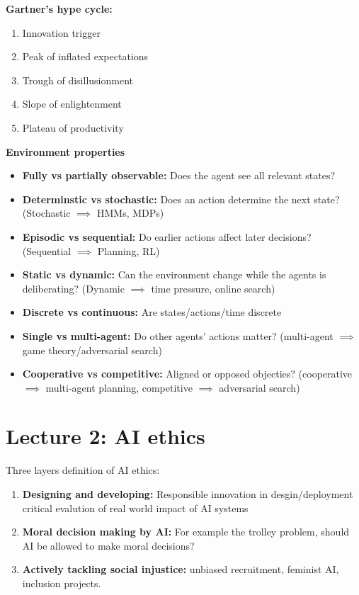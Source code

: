 \documentclass[12pt,a4paper]{article}
\begin{document}
\vspace{10pt}
\textbf{Gartner's hype cycle:}
\begin{enumerate}
    \item Innovation trigger
    \item Peak of inflated expectations
    \item Trough of disillusionment
    \item Slope of enlightenment
    \item Plateau of productivity
\end{enumerate}

\textbf{Environment properties}
\begin{itemize}
    \item \textbf{Fully vs partially observable:} Does the agent see all relevant states?
    \item \textbf{Determinstic vs stochastic:} Does an action determine the next state? (Stochastic $\implies$ HMMs, MDPs)
    \item \textbf{Episodic vs sequential:} Do earlier actions affect later decisions? (Sequential $\implies$ Planning, RL)
    \item \textbf{Static vs dynamic:} Can the environment change while the agents is deliberating? (Dynamic $\implies$ time pressure, online search)
    \item \textbf{Discrete vs continuous:} Are states/actions/time discrete
    \item \textbf{Single vs multi-agent:} Do other agents' actions matter? (multi-agent $\implies$ game theory/adversarial search)
    \item \textbf{Cooperative vs competitive:} Aligned or opposed objecties? (cooperative $\implies$ multi-agent planning, competitive $\implies$ adversarial search)
\end{itemize}

\section{Lecture 2: AI ethics}
Three layers definition of AI ethics:
\begin{enumerate}
    \item \textbf{Designing and developing:} Responsible innovation in desgin/deployment critical evalution of real world impact of AI systems
    \item \textbf{Moral decision making by AI:} For example the trolley problem, should AI be allowed to make moral decisions?
    \item \textbf{Actively tackling social injustice:} unbiased recruitment, feminist AI, inclusion projects.
\end{enumerate}
\end{document}
